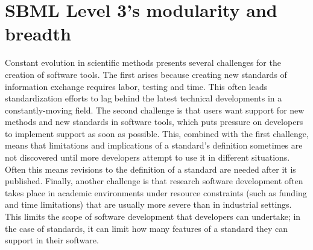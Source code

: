 \documentclass[]{draft-sbml-paper}
\begin{document}
\clearpage
\newpage

\section*{SBML Level 3's modularity and breadth}\label{sec:modularity}

Constant evolution in scientific methods presents several challenges for the creation of software tools.  The first arises because creating new standards of information exchange requires labor, testing and time.  This often leads standardization efforts to lag behind the latest technical developments in a constantly-moving field.  The second challenge is that users want support for new methods and new standards in software tools, which puts pressure on developers to implement support as soon as possible.  This, combined with the first challenge, means that limitations and implications of a standard's definition sometimes are not discovered until more developers attempt to use it in different situations.  Often this means revisions to the definition of a standard are needed after it is published.  Finally, another challenge is that research software development often takes place in academic environments under resource constraints (such as funding and time limitations) that are usually more severe than in industrial settings.  This limits the scope of software development that developers can undertake; in the case of standards, it can limit how many features of a standard they can support in their software.
\end{document}
